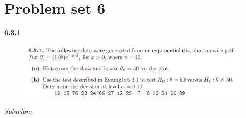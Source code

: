 \documentclass{book}
\theoremstyle{definition}
\begin{document}
\newpage










\section{Problem set 6}





\noindent \textbf{6.3.1}
\begin{figure}[!htb]
	\centering
	\includegraphics[scale=0.6]{631}
\end{figure}

\noindent \textit{Solution:} 
\end{document}
